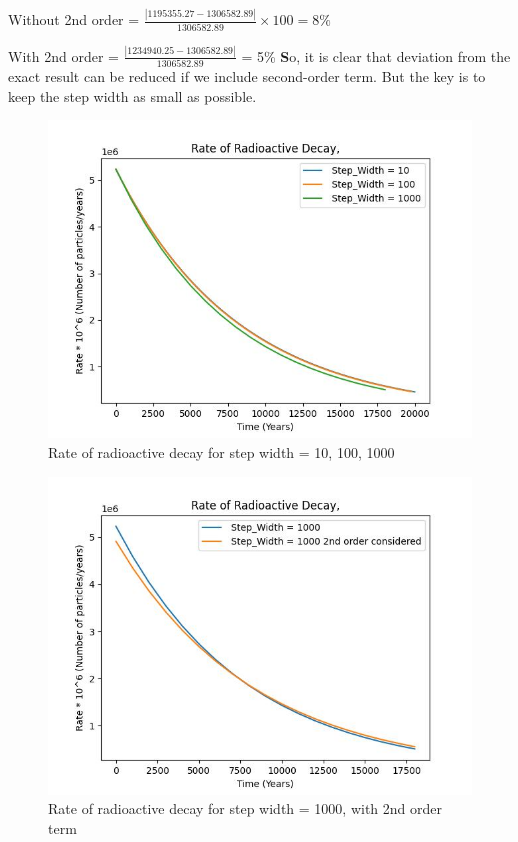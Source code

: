 \documentclass[11pt]{article}
\begin{document}
Without 2nd order = $\frac{\left|1195355.27 - 1306582.89\right|}{1306582.89} \times 100 = 8\%$

With 2nd order = $\frac{\left|1234940.25 - 1306582.89\right|}{1306582.89}$  = 5\% \textbf 

So, it is clear that deviation from the exact result can be reduced if we include second-order term. But the key is to keep the step width as small as possible.



\begin{figure}[b]
    \centering
    \includegraphics[options]{Carbon_plot_10_100_1000.jpeg}
    \caption{Rate of radioactive decay for step width = 10, 100, 1000}
    \label{fig:Rate of radioactive decay for step width = 10, 100, 1000}
\end{figure}

\begin{figure}[b]
    \centering
    \includegraphics[options]{Carbon_plot_1000_with 2nd order.jpeg}
    \caption{Rate of radioactive decay for step width = 1000, with 2nd order term}
    \label{fig:Rate of radioactive decay for step width = 1000, with 2nd order term}
\end{figure}
\end{document}
